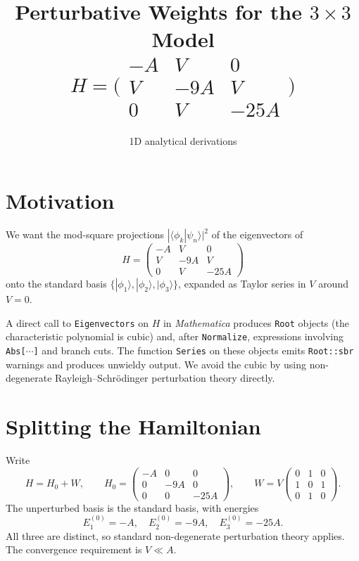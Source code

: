 \documentclass[11pt]{article}
\title{Perturbative Weights for the $3\times 3$ Model\\
\large $H = \bigl(\begin{smallmatrix}-A & V & 0\\ V & -9A & V\\ 0 & V & -25A\end{smallmatrix}\bigr)$}
\author{1D analytical derivations}
\date{}
\begin{document}
\maketitle

\section{Motivation}

We want the mod-square projections $|\langle \phi_k | \psi_n\rangle|^2$ of the eigenvectors of
\begin{equation}
H = \begin{pmatrix} -A & V & 0 \\ V & -9A & V \\ 0 & V & -25A \end{pmatrix}
\label{eq:H}
\end{equation}
onto the standard basis $\{|\phi_1\rangle, |\phi_2\rangle, |\phi_3\rangle\}$, expanded as Taylor series in $V$ around $V=0$.

A direct call to \texttt{Eigenvectors} on $H$ in \emph{Mathematica} produces \texttt{Root} objects (the characteristic polynomial is cubic) and, after \texttt{Normalize}, expressions involving \texttt{Abs[$\cdots$]} and branch cuts. The function \texttt{Series} on these objects emits \texttt{Root::sbr} warnings and produces unwieldy output. We avoid the cubic by using non-degenerate Rayleigh--Schr\"odinger perturbation theory directly.

\section{Splitting the Hamiltonian}

Write
\begin{equation}
H = H_0 + W, \qquad
H_0 = \begin{pmatrix} -A & 0 & 0 \\ 0 & -9A & 0 \\ 0 & 0 & -25A \end{pmatrix}, \qquad
W = V \begin{pmatrix} 0 & 1 & 0 \\ 1 & 0 & 1 \\ 0 & 1 & 0 \end{pmatrix}.
\end{equation}
The unperturbed basis is the standard basis, with energies
\begin{equation}
E_1^{(0)} = -A,\quad E_2^{(0)} = -9A,\quad E_3^{(0)} = -25A.
\end{equation}
All three are distinct, so standard non-degenerate perturbation theory applies. The convergence requirement is $V \ll A$.
\end{document}
